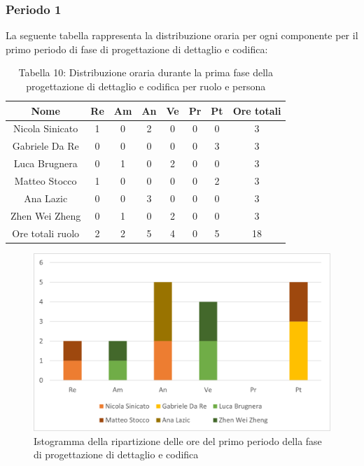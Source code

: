 \subsubsection{Periodo 1}
%
La seguente tabella rappresenta la distribuzione oraria per ogni componente per il primo periodo di fase di progettazione di dettaglio e codifica:
\begin{table}[h]
	\setlength\extrarowheight{5pt}
	\centering
	\begin{tabularx}{\textwidth}{|ccccccc|c|}
		\hline
		\rowcolor{white}
		\textbf{Nome} & \textbf{Re} & \textbf{Am} & \textbf{An} & \textbf{Ve} & \textbf{Pr}& \textbf{Pt} & \textbf{Ore totali} \\
		\hline
		Nicola Sinicato &1&0&2&0&0&0&3 \\
		Gabriele Da Re &0&0&0&0&0&3&3 \\
		Luca Brugnera &0&1&0&2&0&0&3 \\
		Matteo Stocco &1&0&0&0&0&2&3 \\
		Ana Lazic &0&0&3&0&0&0&3 \\
		Zhen Wei Zheng &0&1&0&2&0&0&3 \\
		\hline
		Ore totali ruolo &2&2&5&4&0&5&18 \\
		\hline
	\end{tabularx}
	\vspace{10pt}
	\caption{Tabella 10: Distribuzione oraria durante la prima fase della progettazione di dettaglio e codifica per ruolo e persona}
\end{table}
\begin{figure}[H]
    \centering
    \includegraphics[scale=0.6]{img/grafi preventivo/istogrammi/codifica/periodo1.png}
    \caption{Istogramma della ripartizione delle ore del primo periodo della fase di progettazione di dettaglio e codifica}
\end{figure}
